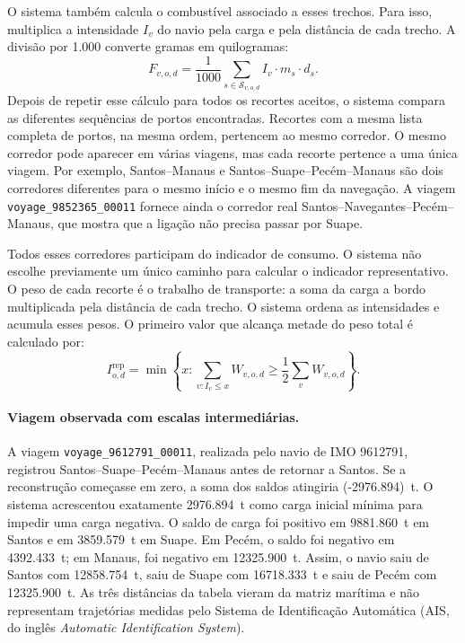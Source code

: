 \documentclass[12pt,a4paper]{report}
\begin{document}
O sistema também calcula o combustível associado a esses trechos. Para isso, multiplica a intensidade \(I_v\) do navio pela carga e pela distância de cada trecho. A divisão por 1.000 converte gramas em quilogramas:
\begin{equation}
F_{v,o,d} = \frac{1}{1000}
\sum_{s \in \mathcal{S}_{v,o,d}} I_v \cdot m_s \cdot d_s.
\label{eq:route-intensity}
\end{equation}
Depois de repetir esse cálculo para todos os recortes aceitos, o sistema compara as diferentes sequências de portos encontradas. Recortes com a mesma lista completa de portos, na mesma ordem, pertencem ao mesmo corredor. O mesmo corredor pode aparecer em várias viagens, mas cada recorte pertence a uma única viagem. Por exemplo, Santos--Manaus e Santos--Suape--Pecém--Manaus são dois corredores diferentes para o mesmo início e o mesmo fim da navegação. A viagem \texttt{voyage\_9852365\_00011} fornece ainda o corredor real Santos--Navegantes--Pecém--Manaus, que mostra que a ligação não precisa passar por Suape.

Todos esses corredores participam do indicador de consumo. O sistema não escolhe previamente um único caminho para calcular o indicador representativo. O peso de cada recorte é o trabalho de transporte: a soma da carga a bordo multiplicada pela distância de cada trecho. O sistema ordena as intensidades e acumula esses pesos. O primeiro valor que alcança metade do peso total é calculado por:
\begin{equation}
I_{o,d}^{\mathrm{rep}} = \min\left\{x:\sum_{v:I_v\leq x} W_{v,o,d} \geq \frac{1}{2}\sum_v W_{v,o,d}\right\}.
\label{eq:od-weighted-median}
\end{equation}
\paragraph{Viagem observada com escalas intermediárias.} A viagem \texttt{voyage\_9612791\_00011}, realizada pelo navio de IMO 9612791, registrou Santos--Suape--Pecém--Manaus antes de retornar a Santos. Se a reconstrução começasse em zero, a soma dos saldos atingiria (-\num{2976.894})~t. O sistema acrescentou exatamente \num{2976.894}~t como carga inicial mínima para impedir uma carga negativa. O saldo de carga foi positivo em \num{9881.860}~t em Santos e em \num{3859.579}~t em Suape. Em Pecém, o saldo foi negativo em \num{4392.433}~t; em Manaus, foi negativo em \num{12325.900}~t. Assim, o navio saiu de Santos com \num{12858.754}~t, saiu de Suape com \num{16718.333}~t e saiu de Pecém com \num{12325.900}~t. As três distâncias da tabela vieram da matriz marítima e não representam trajetórias medidas pelo Sistema de Identificação Automática (AIS, do inglês \emph{Automatic Identification System}).
\end{document}
